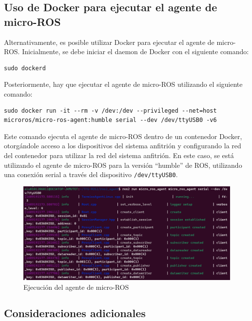 \subsection{Uso de Docker para ejecutar el agente de micro-ROS}

Alternativamente, es posible utilizar Docker para ejecutar el agente de micro-ROS. Inicialmente, se debe iniciar el daemon de Docker con el siguiente comando:

\begin{verbatim}
sudo dockerd
\end{verbatim}

Posteriormente, hay que ejecutar el agente de micro-ROS utilizando el siguiente comando:

\begin{verbatim}
sudo docker run -it --rm -v /dev:/dev --privileged --net=host
microros/micro-ros-agent:humble serial --dev /dev/ttyUSB0 -v6
\end{verbatim}

Este comando ejecuta el agente de micro-ROS dentro de un contenedor Docker, otorgándole acceso a los dispositivos del sistema anfitrión y configurando la red del contenedor para utilizar la red del sistema anfitrión. En este caso, se está utilizando el agente de micro-ROS para la versión ``humble'' de ROS, utilizando una conexión serial a través del dispositivo \texttt{/dev/ttyUSB0}.

\begin{figure}[ht]
   \centering
    \includegraphics[width=1\linewidth]{figures/ros-agent.png}
   \caption{Ejecución del agente de micro-ROS}
   \label{figure:microrosagent}
\end{figure}


\subsection{Consideraciones adicionales}

